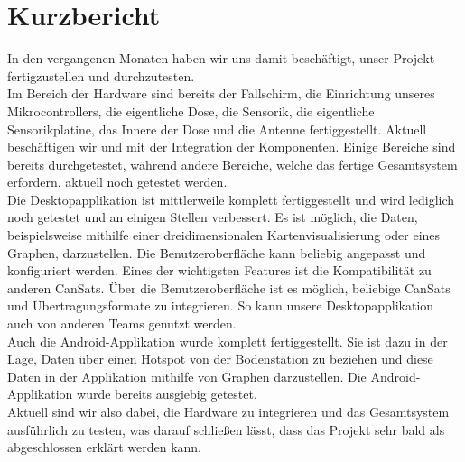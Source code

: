 \section{Kurzbericht}
In den vergangenen Monaten haben wir uns damit beschäftigt, unser Projekt fertigzustellen und durchzutesten. \\
Im Bereich der Hardware sind bereits der Fallschirm, die Einrichtung unseres Mikrocontrollers, die eigentliche Dose, die Sensorik, die eigentliche Sensorikplatine, das Innere der Dose und die Antenne fertiggestellt. Aktuell beschäftigen wir und mit der Integration der Komponenten. Einige Bereiche sind bereits durchgetestet, während andere Bereiche, welche das fertige Gesamtsystem erfordern, aktuell noch getestet werden. \\
Die Desktopapplikation ist mittlerweile komplett fertiggestellt und wird lediglich noch getestet und an einigen Stellen verbessert. Es ist möglich, die Daten, beispielsweise mithilfe einer dreidimensionalen Kartenvisualisierung oder eines Graphen, darzustellen. Die Benutzeroberfläche kann beliebig angepasst und konfiguriert werden. Eines der wichtigsten Features ist die Kompatibilität zu anderen CanSats. Über die Benutzeroberfläche ist es möglich, beliebige CanSats und Übertragungsformate zu integrieren. So kann unsere Desktopapplikation auch von anderen Teams genutzt werden. \\
Auch die Android-Applikation wurde komplett fertiggestellt. Sie ist dazu in der Lage, Daten über einen Hotspot von der Bodenstation zu beziehen und diese Daten in der Applikation mithilfe von Graphen darzustellen. Die Android-Applikation wurde bereits ausgiebig getestet. \\
Aktuell sind wir also dabei, die Hardware zu integrieren und das Gesamtsystem ausführlich zu testen, was darauf schließen lässt, dass das Projekt sehr bald als abgeschlossen erklärt werden kann.